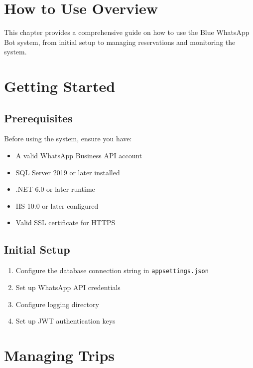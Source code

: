 \section{How to Use Overview}
This chapter provides a comprehensive guide on how to use the Blue WhatsApp Bot system, from initial setup to managing reservations and monitoring the system.

\section{Getting Started}

\subsection{Prerequisites}
Before using the system, ensure you have:
\begin{itemize}
    \item A valid WhatsApp Business API account
    \item SQL Server 2019 or later installed
    \item .NET 6.0 or later runtime
    \item IIS 10.0 or later configured
    \item Valid SSL certificate for HTTPS
\end{itemize}

\subsection{Initial Setup}
\begin{enumerate}
    \item Configure the database connection string in \texttt{appsettings.json}
    \item Set up WhatsApp API credentials
    \item Configure logging directory
    \item Set up JWT authentication keys
\end{enumerate}

\section{Managing Trips}

